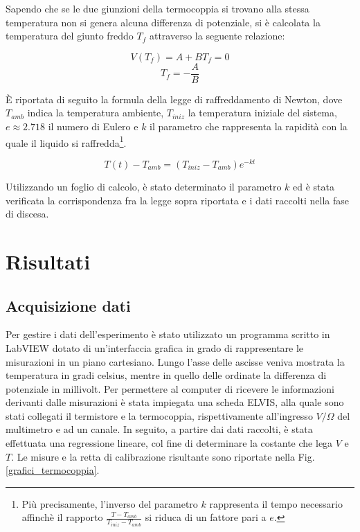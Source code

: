\documentclass{article}
\begin{document}
Sapendo che se le due giunzioni della termocoppia si trovano alla stessa temperatura non si genera alcuna differenza di potenziale, si è calcolata la temperatura del giunto freddo $T_f$ attraverso la seguente relazione:

$$V(T_f)=A+BT_f=0$$
$$T_f=-\frac{A}{B}$$

È riportata di seguito la formula della legge di raffreddamento di Newton, dove $T_{amb}$ indica la temperatura ambiente, $T_{iniz}$ la temperatura iniziale del sistema, $e \approx 2.718$ il numero di Eulero e $k$ il parametro che rappresenta la rapidità con la quale il liquido si raffredda\footnote{Più precisamente, l’inverso del parametro $k$ rappresenta il tempo necessario affinchè il rapporto $\frac{T-T_{amb}}{T_{iniz}-T_{amb}}$ si riduca di un fattore pari a $e$.}.

$$
T(t)-T_{amb}=(T_{iniz}-T_{amb})e^{-kt}
$$

Utilizzando un foglio di calcolo, è stato determinato il parametro $k$ ed è stata verificata la corrispondenza fra la legge sopra riportata e i dati raccolti nella fase di discesa.

\section{Risultati}

\subsection{Acquisizione dati}
\label{acquisizione_dati}
Per gestire i dati dell'esperimento è stato utilizzato un programma scritto in LabVIEW dotato di un'interfaccia grafica in grado di rappresentare le misurazioni in un piano cartesiano. Lungo l'asse delle ascisse veniva mostrata la temperatura in gradi celsius, mentre in quello delle ordinate la differenza di potenziale in millivolt.
Per permettere al computer di ricevere le informazioni derivanti dalle misurazioni è stata impiegata una scheda ELVIS, alla quale sono stati collegati il termistore e la termocoppia, rispettivamente all'ingresso $V/\Omega$ del multimetro e ad un canale. In seguito, a partire dai dati raccolti, è stata effettuata una regressione lineare, col fine di determinare la costante che lega $V$ e $T$. Le misure e la retta di calibrazione risultante sono riportate nella Fig. \ref{grafici_termocoppia}.
\end{document}
